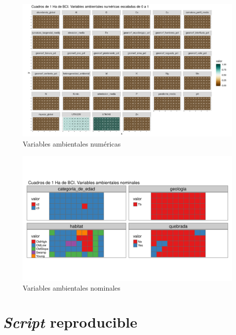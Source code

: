 \documentclass[11pt,]{article}
\begin{document}
\begin{figure}
\centering
\includegraphics[width=1.10000\textwidth]{mapas_variables_ambientales_numericas.png}
\caption{\label{fig:soporte1} Variables ambientales numéricas}
\end{figure}

\begin{figure}
\centering
\includegraphics[width=1.10000\textwidth]{mapas_variables_ambientales_nominales_tmap.png}
\caption{\label{fig:soporte1} Variables ambientales nominales}
\end{figure}

\section{\texorpdfstring{\emph{Script}
reproducible}{Script reproducible}}\label{script-reproducible}
\end{document}

